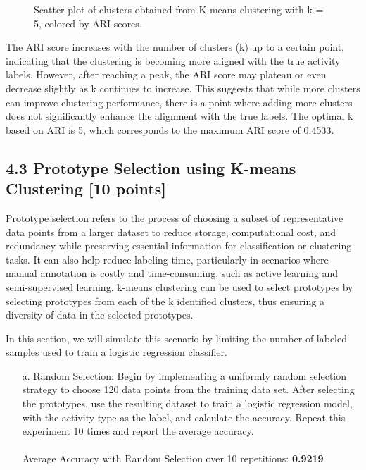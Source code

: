 \documentclass[a3paper,12pt]{extarticle} %
\begin{document}
\begin{enumerate}
\begin{itemize}
\begin{figure}[H]
    \caption{Scatter plot of clusters obtained from K-means clustering with k = 5, colored by ARI scores.}
    \label{fig:kmeans-clusters-ari}
\end{figure}
The ARI score increases with the number of clusters (k) up to a certain point, indicating that the clustering is becoming more aligned with the true activity labels. However, after reaching a peak, the ARI score may plateau or even decrease slightly as k continues to increase. This suggests that while more clusters can improve clustering performance, there is a point where adding more clusters does not significantly enhance the alignment with the true labels. The optimal k based on ARI is 5, which corresponds to the maximum ARI score of 0.4533.
\end{itemize}

\subsection*{4.3 Prototype Selection using K-means Clustering [10 points]}
Prototype selection refers to the process of choosing a subset of representative data points from a larger dataset to reduce storage, computational cost, and redundancy while preserving essential information for classification or clustering tasks. It can also help reduce labeling time, particularly in scenarios where manual annotation is costly and time-consuming, such as active learning and semi-supervised learning. k-means clustering can be used to select prototypes by selecting prototypes from each of the k identified clusters, thus ensuring a diversity of data in the selected prototypes.

In this section, we will simulate this scenario by limiting the number of labeled samples used to train a logistic regression classifier.

\begin{itemize}
\item[a.] Random Selection: Begin by implementing a uniformly random selection strategy to choose 120 data points from the training data set. After selecting the prototypes, use the resulting dataset to train a logistic regression model, with the activity type as the label, and calculate the accuracy. Repeat this experiment 10 times and report the average accuracy.
\\\\ Average Accuracy with Random Selection over 10 repetitions:\textbf{ 0.9219}
\\


\end{itemize}
\end{enumerate}
\end{document}
